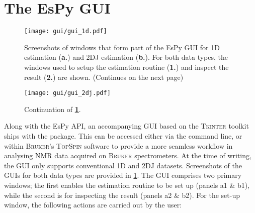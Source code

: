 \section{The \acs{EsPy} \acs{GUI}}
\begin{figure}
    \centering
    \texttt{[image: gui/gui\_1d.pdf]}
    \caption[
        Screenshots of the \acs{EsPy} \acs{GUI} for \ac{1D} and \acs{2DJ} estimation.
    ]{
        Screenshots of windows that form part of the \ac{EsPy} \ac{GUI} for
        \ac{1D} estimation (\textbf{a.}) and \ac{2DJ} estimation (\textbf{b.}).
        For both data types, the windows used to setup the estimation routine
        (\textbf{1.}) and inspect the result (\textbf{2.}) are shown.
        (Continues on the next page)
    }
    \label{fig:gui}
\end{figure}
\begin{figure}%
    \ContinuedFloat
    \centering
    \texttt{[image: gui/gui\_2dj.pdf]}
    \caption*{Continuation of \textbf{\textsc{\cref{fig:gui}}}.}
\end{figure}
Along with the \ac{EsPy} \ac{API}, an accompanying \ac{GUI} based on the
\textsc{Tkinter} toolkit ships with the
package. This can be accessed either via the command line, or within
\textsc{Bruker}'s \textsc{TopSpin} software to provide a more seamless workflow
in analysing \ac{NMR} data acquired on \textsc{Bruker} spectrometers.
At the time of writing, the \ac{GUI} only supports conventional \ac{1D}
and \ac{2DJ} datasets. Screenshots of the \acp{GUI} for both data types are
provided in \cref{fig:gui}.
The \ac{GUI} comprises two primary windows; the first enables the estimation
routine to be set up (panels a1 \& b1), while the second is for inspecting the
result (panels a2 \& b2). For the set-up window, the following actions are
carried out by the user:
